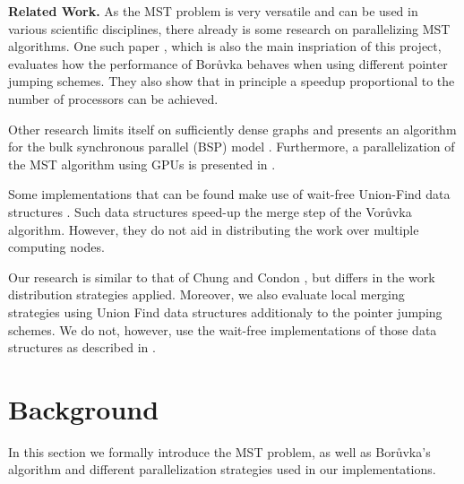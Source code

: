 \documentclass[letterpaper]{article}
\newcommand{\mypar}[1]{{\bf #1.}}
\begin{document}
\mypar{Related Work}
As the MST problem is very versatile and can be used in various scientific disciplines, there already is some research
on parallelizing MST algorithms. One such paper \cite{chung1996parallel}, which is also the main inspriation of this
project, evaluates how the performance of Bor\r{u}vka behaves when using different pointer jumping schemes. They also
show that in principle a speedup proportional to the number of processors can be achieved.

Other research limits itself on sufficiently dense graphs and presents an algorithm for the bulk synchronous parallel
(BSP) model \cite{dehne1998practical}. Furthermore, a parallelization of the MST algorithm using GPUs is presented in
\cite{de2017parallel}.

Some implementations that can be found make use of wait-free Union-Find data structures \cite{wfuf}. Such data
structures speed-up the merge step of the Vor\r{u}vka algorithm. However, they do not aid in distributing the work over
multiple computing nodes.

Our research is similar to that of Chung and Condon \cite{chung1996parallel}, but differs in the work distribution
strategies applied. Moreover, we also evaluate local merging strategies using Union Find data structures additionaly to
the pointer jumping schemes. We do not, however, use the wait-free implementations of those data structures as described
in \cite{wfuf}.

\section{Background}
%
%
%
\label{sec:background}
In this section we formally introduce the MST problem, as well as Bor\r{u}vka's algorithm and different parallelization
strategies used in our implementations.
\end{document}

